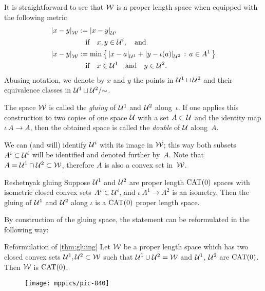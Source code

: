 It is straightforward to see that $\mathcal{W}$ is a proper length space when equipped with the following metric
\begin{align*}
\dist{x}{y}{\spc{W}}&\df\dist{x}{y}{\spc{U}^i}
\\
&\quad\text{if}\quad x,y\in \spc{U}^i,\quad\text{and}
\\
\dist{x}{y}{\spc{W}}&\df\min\set{\dist{x}{a}{\spc{U}^1}+\dist{y}{\iota(a)}{\spc{U}^2}}{a\in A^1}
\\
&\quad\text{if}\quad x\in \spc{U}^1\quad\text{and}\quad y\in \spc{U}^2.
\end{align*}
Abusing notation, we denote by $x$ and $y$ the points in $\mathcal{U}^1\sqcup\mathcal{U}^2$ and their equivalence classes in $\mathcal{U}^1\sqcup\mathcal{U}^2/{{\sim}}$.

The  space $\mathcal{W}$ is called the \emph{gluing} of $\mathcal{U}^1$ and  $\mathcal{U}^2$ along~$\iota$.
If one applies this construction to two copies of one space $\mathcal{U}$ with a set $A\subset \mathcal{U}$ and the identity map $\iota\:A\to A$, then the obtained space is called the \emph{double} of $\mathcal{U}$ along~$A$.

We can (and will) identify $\mathcal{U}^i$ with its image in $\mathcal{W}$;
this way both subsets $A^i\subset \mathcal{U}^i$ will be identified and denoted further by~$A$.
Note that $A=\mathcal{U}^1\cap \mathcal{U}^2\subset \mathcal{W}$,
therefore $A$ is also a convex set in~$\mathcal{W}$.

\begin{thm}{Reshetnyak gluing}\label{thm:gluing}
Suppose 
$\mathcal{U}^1$ and $\mathcal{U}^2$ are proper length $\mathrm{CAT}(0)$ spaces 
with isometric 
closed 
 convex
sets $A^i\subset\mathcal{U}^i$, and $\iota\:A^1\to A^2$ is an isometry.
Then the gluing of $\mathcal{U}^1$ and  $\mathcal{U}^2$ along $\iota$ is a $\mathrm{CAT}(0)$ proper length space.
\end{thm}

By construction of the gluing space, the statement can be reformulated in the following way:


\begin{thm}{Reformulation of \ref{thm:gluing}}
Let $\mathcal{W}$ be a 
proper length space which has two closed 
convex sets $\mathcal{U}^1,\mathcal{U}^2\subset\mathcal{W}$ such that 
$\mathcal{U}^1\cup\mathcal{U}^2=\mathcal{W}$
and $\mathcal{U}^1$, $\mathcal{U}^2$ are $\mathrm{CAT}(0)$.
Then $\mathcal{W}$ is $\mathrm{CAT}(0)$.
\end{thm}

\begin{wrapfigure}{o}{45mm}
\vskip-2mm
\centering
\texttt{[image: mppics/pic-840]}
\end{wrapfigure}

